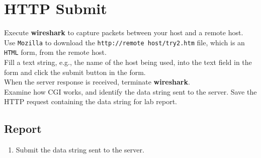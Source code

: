 \documentclass[10pt,a4paper]{article}
\numberwithin{equation}{section}
\numberwithin{figure}{section}
\numberwithin{table}{section}
\begin{document}
    \section*{HTTP Submit}
    Execute \textbf{wireshark} to capture packets between your host and a remote host. \\
    Use \texttt{Mozilla} to download the \texttt{http://remote host/try2.htm} file, which is an \texttt{HTML} form, from the remote host. \\
    Fill a text string, e.g., the name of the host being used, into the text field in the form and click the submit button in the form. \\
    When the server response is received, terminate \textbf{wireshark}. \\
    Examine how CGI works, and identify the data string sent to the server.
    Save the HTTP request containing the data string for lab report.

    \subsection*{Report}
    \begin{enumerate}
        \item Submit the data string sent to the server.
    \end{enumerate}


\end{document}
